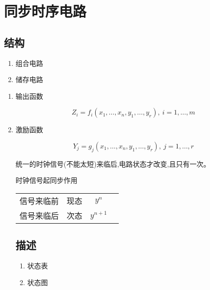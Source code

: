 \chapter{同步时序电路}
\newpage

\section{结构}

\begin{enumerate}

    \item 组合电路
    \item 储存电路

\end{enumerate}

\begin{enumerate}

\item 输出函数

\begin{equation}
    Z_i=f_i(x_1,\dots,x_n,y_1,\dots,y_r),~i=1,\dots,m
\end{equation}

\item 激励函数

\begin{equation}
    Y_j=g_j(x_1,\dots,x_n,y_1,\dots,y_r),~j=1,\dots,r
\end{equation}

统一的时钟信号(不能太短)来临后,电路状态才改变,且只有一次。

\newpage

时钟信号起同步作用

\begin{table}[!htbp]
    \centering
    \begin{tabular}{lc|c|c}
        \toprule
        信号来临前 & 现态 & $y^{n}$   \\
        信号来临后 & 次态 & $y^{n+1}$ \\
        \bottomrule
    \end{tabular}
\end{table}

\section{描述}

\begin{enumerate}
    \item 状态表
    \item 状态图
\end{enumerate}


\end{enumerate}
